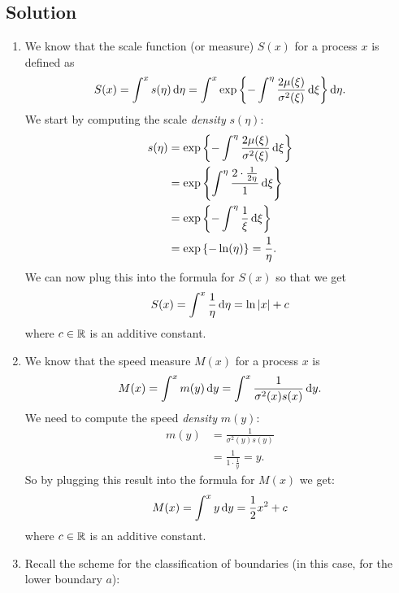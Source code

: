 \documentclass[12pt]{article}
\begin{document}
	\subsection*{Solution}
	\begin{enumerate}
		\item We know that the scale function (or measure) $S(x)$ for a process $x$ is defined as
		\begin{equation*}
			S(x)=\int^{x}s(\eta)\mathop{}\!\mathrm{d}\eta=\int^{x}\exp\left\{-\int^{\eta}\frac{2\mu(\xi)}{\sigma^{2}(\xi)}\mathop{}\!\mathrm{d}\xi\right\}\mathop{}\!\mathrm{d}\eta.
		\end{equation*} 
		We start by computing the scale \textit{density} $s(\eta)$:
		\begin{align*}
			s(\eta)&=\exp\left\{-\int^{\eta}\frac{2\mu(\xi)}{\sigma^{2}(\xi)}\mathop{}\!\mathrm{d}\xi\right\}\\
			&=\exp\left\{\int^{\eta}\frac{2\cdot\frac{1}{2\eta}}{1}\mathop{}\!\mathrm{d}\xi\right\}\\
			&=\exp\left\{-\int^{\eta}\frac{1}{\xi}\mathop{}\!\mathrm{d}\xi\right\}\\
			&=\exp\left\{-\ln(\eta)\right\}=\frac{1}{\eta}.
		\end{align*}
		We can now plug this into the formula for $S(x)$ so that we get
		\begin{equation*}
			S(x)=\int^{x}\frac{1}{\eta}\mathop{}\!\mathrm{d}\eta=\ln |x|+c
		\end{equation*}
		where $c\in\mathbb{R}$ is an additive constant.
		\item We know that the speed measure $M(x)$ for a process $x$ is
		\begin{equation*}
			M(x)=\int^{x}m(y)\mathop{}\!\mathrm{d} y=\int^{x}\frac{1}{\sigma^{2}(x)s(x)}\mathop{}\!\mathrm{d} y.
		\end{equation*} 
		We need to compute the speed \textit{density} $m(y)$:
		\begin{align*}
			m(y)&=\frac{1}{\sigma^{2}(y)s(y)}\\
			&=\frac{1}{1\cdot\frac{1}{y}}=y.
		\end{align*}
		So by plugging this result into the formula for $M(x)$ we get:
		\begin{equation*}
			M(x)=\int^{x}y\mathop{}\!\mathrm{d} y=\frac{1}{2}x^{2}+c
		\end{equation*}
		where $c\in\mathbb{R}$ is an additive constant.
		\item Recall the scheme for the classification of boundaries (in this case, for the lower boundary $a$):
		\begin{table}[H]
			\centering
\end{table}
\end{enumerate}
\end{document}
